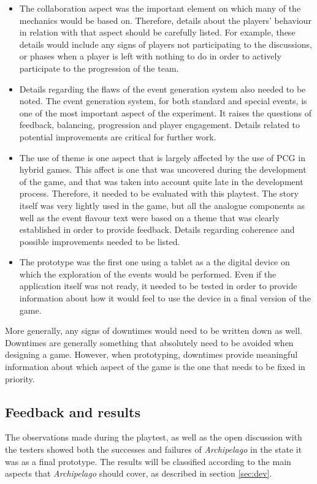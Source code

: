 \begin{itemize}
\item The collaboration aspect was the important element on which many of the mechanics would be based on. Therefore, details about the players' behaviour in relation with that aspect should be carefully listed. For example, these details would include any signs of players not participating to the discussions, or phases when a player is left with nothing to do in order to actively participate to the progression of the team.
\item Details regarding the flaws of the event generation system also needed to be noted. The event generation system, for both standard and special events, is one of the most important aspect of the experiment. It raises the questions of feedback, balancing, progression and player engagement. Details related to potential improvements are critical for further work.
\item The use of theme is one aspect that is largely affected by the use of PCG in hybrid games. This affect is one that was uncovered during the development of the game, and that was taken into account quite late in the development process. Therefore, it needed to be evaluated with this playtest. The story itself was very lightly used in the game, but all the analogue components as well as the event flavour text were based on a theme that was clearly established in order to provide feedback. Details regarding coherence and possible improvements needed to be listed.
\item The prototype was the first one using a tablet as a the digital device on which the exploration of the events would be performed. Even if the application itself was not ready, it needed to be tested in order to provide information about how it would feel to use the device in a final version of the game. 
\end{itemize}

More generally, any signs of downtimes would need to be written down as well. Downtimes are generally something that absolutely need to be avoided when designing a game. However, when prototyping, downtimes provide meaningful information about which aspect of the game is the one that needs to be fixed in priority.
\subsection{Feedback and results}
The observations made during the playtest, as well as the open discussion with the testers showed both the successes and failures of \textit{Archipelago} in the state it was as a final prototype. The results will be classified according to the main aspects that \textit{Archipelago} should cover, as described in section \ref{sec:dev}.

